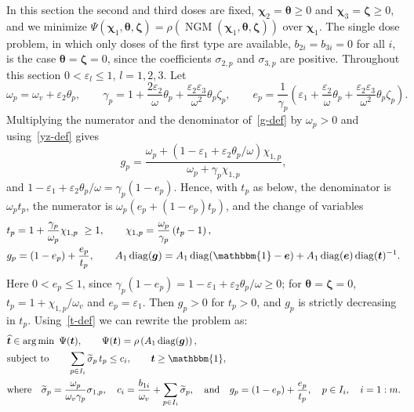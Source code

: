 \documentclass[11pt]{article}
\theoremstyle{plain}
\theoremstyle{definition}
\theoremstyle{remark}
\numberwithin{equation}{section}
\numberwithin{figure}{section}
\numberwithin{table}{section}
\numberwithin{algorithm}{section}
\begin{document}
In this section the second and third doses are fixed,
$\bm\chi_2=\bm\theta\ge 0$ and $\bm\chi_3=\bm\zeta\ge 0$, and we minimize
$\Psi(\bm\chi_1,\bm\theta,\bm\zeta)=\rho\left(\operatorname{NGM}(\bm\chi_1,\bm\theta,\bm\zeta)\right)$ over
$\bm\chi_1$. The single dose problem, in which only doses of the first type
are available, $b_{2i}=b_{3i}=0$ for all $i$, is the case
$\bm\theta=\bm\zeta=0$, since the coefficients $\sigma_{2,p}$ and
$\sigma_{3,p}$ are positive. Throughout this section
$0<\varepsilon_l\le 1$, $l=1,2,3$. Let
\begin{equation}\label{t-coeffs}
\omega_p=\omega_v+\varepsilon_2\theta_p,\qquad
\gamma_p=1+\frac{2\varepsilon_2}{\omega}\theta_p+\frac{\varepsilon_2\varepsilon_3}{\omega^2}\theta_p\zeta_p,\qquad
e_p=\frac{1}{\gamma_p}\left(\varepsilon_1+\frac{\varepsilon_2}{\omega}\theta_p+\frac{\varepsilon_2\varepsilon_3}{\omega^2}\theta_p\zeta_p\right).
\end{equation}
Multiplying the numerator and the denominator of~\eqref{g-def} by $\omega_p>0$
and using~\eqref{yz-def} gives
\begin{equation}\label{t-PQ}
g_p=\frac{\omega_p+\left(1-\varepsilon_1+\varepsilon_2\theta_p/\omega\right)\chi_{1,p}}{\omega_p+\gamma_p\chi_{1,p}},
\end{equation}
and $1-\varepsilon_1+\varepsilon_2\theta_p/\omega=\gamma_p(1-e_p)$. Hence, with
$t_p$ as below, the denominator is $\omega_pt_p$, the numerator is
$\omega_p\left(e_p+(1-e_p)t_p\right)$, and the change of variables
\begin{equation}\label{t-def}
\begin{aligned}
&t_p=1+\frac{\gamma_p}{\omega_p}\chi_{1,p}\ \ge 1,\qquad
\chi_{1,p}=\frac{\omega_p}{\gamma_p}\left(t_p-1\right),\\
&g_p=(1-e_p)+\frac{e_p}{t_p},\qquad
A_1\operatorname{diag}(\bm g)=A_1\operatorname{diag}(\mathbbm{1}-\bm e)+A_1\operatorname{diag}(\bm e)\operatorname{diag}(\bm t)^{-1}.
\end{aligned}
\end{equation}
Here $0<e_p\le 1$, since
$\gamma_p(1-e_p)=1-\varepsilon_1+\varepsilon_2\theta_p/\omega\ge 0$; for
$\bm\theta=\bm\zeta=0$, $t_p=1+\chi_{1,p}/\omega_v$ and $e_p=\varepsilon_1$.
Then $g_p>0$ for $t_p>0$, and $g_p$ is strictly decreasing in $t_p$.
Using~\eqref{t-def} we can rewrite the problem as:
\begin{subequations}\label{t-program}
\begin{align}
&\widehat{\bm t}\in\operatorname*{arg\,min}\ \Psi(\bm t),\qquad
\Psi(\bm t)=\rho\left(A_1\operatorname{diag}(\bm g)\right),\\
&\mbox{subject to}\qquad
\sum_{p\in I_i}\widetilde\sigma_p\,t_p\le c_i,\qquad \bm t\ge\mathbbm{1},\label{t-constraint}\\
&\mbox{where}\quad \widetilde\sigma_p=\frac{\omega_p}{\omega_v\gamma_p}\sigma_{1,p},\quad
c_i=\frac{b_{1i}}{\omega_v}+\sum_{p\in I_i}\widetilde\sigma_p,
\quad\mbox{and}\quad g_p=(1-e_p)+\frac{e_p}{t_p},\quad p\in I_i,\quad i=1:m.\nonumber
\end{align}
\end{subequations}
\end{document}

